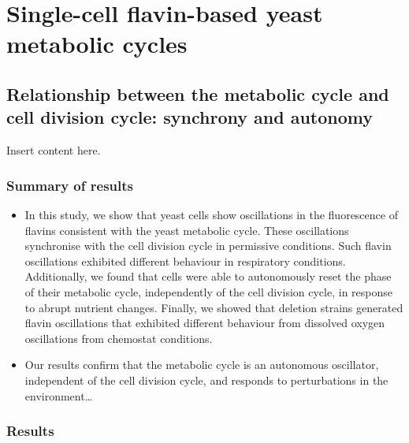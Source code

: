 
\chapter{Single-cell flavin-based yeast metabolic cycles}

\section{Relationship between the metabolic cycle and cell division cycle: synchrony and autonomy}

Insert content here.

\subsection{Summary of results}
\label{sec:orgadeecf8}
\begin{itemize}
\item In this study, we show that yeast cells show oscillations in the fluorescence of flavins consistent with the yeast metabolic cycle.  These oscillations synchronise with the cell division cycle in permissive conditions.  Such flavin oscillations exhibited different behaviour in respiratory conditions.  Additionally, we found that cells were able to autonomously reset the phase of their metabolic cycle, independently of the cell division cycle, in response to abrupt nutrient changes.  Finally, we showed that deletion strains generated flavin oscillations that exhibited different behaviour from dissolved oxygen oscillations from chemostat conditions.
\item Our results confirm that the metabolic cycle is an autonomous oscillator, independent of the cell division cycle, and responds to perturbations in the environment\ldots{}
\end{itemize}

\subsection{Results}
\label{sec:org7d4972e}

